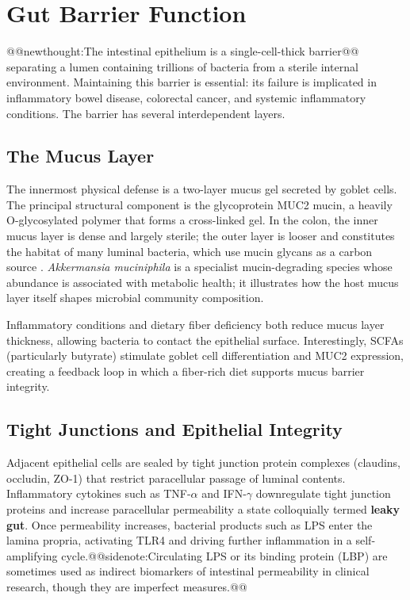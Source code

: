 \documentclass{tufte-handout}
\makeatletter
\def\newthought#1{@@newthought:#1@@}
\def\sidenote#1{@@sidenote:#1@@}
\makeatother
\begin{document}
\section{Gut Barrier Function}

\newthought{The intestinal epithelium is a single-cell-thick barrier} separating a lumen containing trillions of bacteria from a sterile internal environment. Maintaining this barrier is essential: its failure is implicated in inflammatory bowel disease, colorectal cancer, and systemic inflammatory conditions. The barrier has several interdependent layers.

\subsection{The Mucus Layer}

The innermost physical defense is a two-layer mucus gel secreted by goblet cells. The principal structural component is the glycoprotein MUC2 mucin, a heavily O-glycosylated polymer that forms a cross-linked gel. In the colon, the inner mucus layer is dense and largely sterile; the outer layer is looser and constitutes the habitat of many luminal bacteria, which use mucin glycans as a carbon source \citep{johanssonInnerMucusLayer2008}. \textit{Akkermansia muciniphila} is a specialist mucin-degrading species whose abundance is associated with metabolic health; it illustrates how the host mucus layer itself shapes microbial community composition.

Inflammatory conditions and dietary fiber deficiency both reduce mucus layer thickness, allowing bacteria to contact the epithelial surface. Interestingly, SCFAs (particularly butyrate) stimulate goblet cell differentiation and MUC2 expression, creating a feedback loop in which a fiber-rich diet supports mucus barrier integrity.

\subsection{Tight Junctions and Epithelial Integrity}

Adjacent epithelial cells are sealed by tight junction protein complexes (claudins, occludin, ZO-1) that restrict paracellular passage of luminal contents. Inflammatory cytokines such as TNF-$\alpha$ and IFN-$\gamma$ downregulate tight junction proteins and increase paracellular permeability a state colloquially termed \textbf{leaky gut}. Once permeability increases, bacterial products such as LPS enter the lamina propria, activating TLR4 and driving further inflammation in a self-amplifying cycle.\sidenote{Circulating LPS or its binding protein (LBP) are sometimes used as indirect biomarkers of intestinal permeability in clinical research, though they are imperfect measures.}
\end{document}
